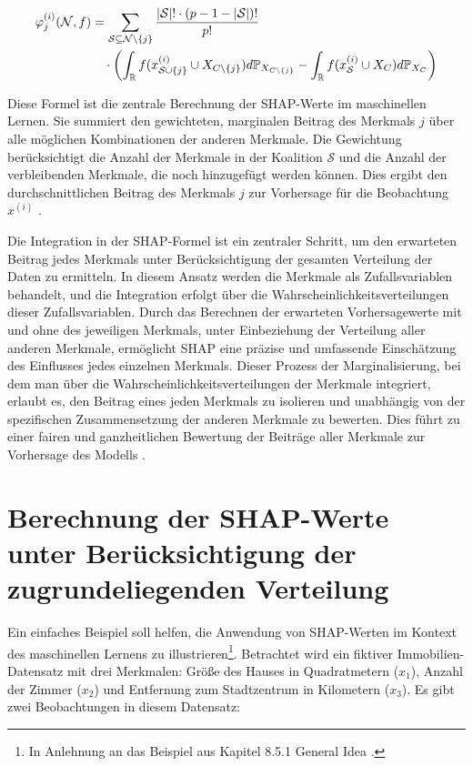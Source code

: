 \begin{align}
    \label{eq:shap-eq}
    \varphi^{(i)}_{j} (\mathcal{N}, f) &= \sum_{\mathcal{S} \subseteq \mathcal{N} \setminus \{j\}} \frac{|\mathcal{S}|! \cdot (p - 1 - |\mathcal{S}|)!}{p!} \\ \notag
    &\quad \cdot \left( \int_{\mathbb{R}} f(x^{(i)}_{\mathcal{S} \cup \{j\}} \cup X_{C \setminus \{j\}}) d\mathbb{P}_{X_{C \setminus \{j\}}} -
    \int_{\mathbb{R}} f(x^{(i)}_{\mathcal{S}} \cup X_{C}) d\mathbb{P}_{X_{C}} \right) 
\end{align}

Diese Formel ist die zentrale Berechnung der SHAP-Werte im maschinellen Lernen. 
Sie summiert den gewichteten, marginalen Beitrag des Merkmals $j$ über alle möglichen Kombinationen der anderen Merkmale. 
Die Gewichtung berücksichtigt die Anzahl der Merkmale in der Koalition $\mathcal{S}$ und die Anzahl der verbleibenden Merkmale, 
die noch hinzugefügt werden können. Dies ergibt den durchschnittlichen Beitrag des Merkmals $j$ zur Vorhersage für die 
Beobachtung $x^{(i)}$ \cite[S. 29, 30]{Molnar_2023}.

Die Integration in der SHAP-Formel ist ein zentraler Schritt, um den erwarteten Beitrag jedes Merkmals unter 
Berücksichtigung der gesamten Verteilung der Daten zu ermitteln. 
In diesem Ansatz werden die Merkmale als Zufallsvariablen behandelt, und die Integration erfolgt über 
die Wahrscheinlichkeitsverteilungen dieser Zufallsvariablen. Durch das Berechnen der erwarteten Vorhersagewerte mit 
und ohne des jeweiligen Merkmals, unter Einbeziehung der Verteilung aller anderen Merkmale, 
ermöglicht SHAP eine präzise und umfassende Einschätzung des Einflusses jedes einzelnen Merkmals. 
Dieser Prozess der Marginalisierung, bei dem man über die Wahrscheinlichkeitsverteilungen der Merkmale integriert, 
erlaubt es, den Beitrag eines jeden Merkmals zu isolieren und unabhängig von der spezifischen Zusammensetzung 
der anderen Merkmale zu bewerten. Dies führt zu einer fairen und ganzheitlichen Bewertung der Beiträge aller Merkmale 
zur Vorhersage des Modells \cite[S. 28]{Molnar_2023}.

\section{Berechnung der SHAP-Werte unter Berücksichtigung der zugrundeliegenden Verteilung}
\label{sec:example}

Ein einfaches Beispiel soll helfen, die Anwendung von SHAP-Werten im 
Kontext des maschinellen Lernens zu illustrieren\footnote{In Anlehnung an das Beispiel aus Kapitel 8.5.1 \glqq{}General Idea\grqq{} \cite[S.215f]{Molnar_2022}.}. Betrachtet wird ein fiktiver 
Immobilien-Datensatz mit drei Merkmalen: Größe des Hauses in Quadratmetern ($x_1$), Anzahl der Zimmer ($x_2$) 
und Entfernung zum Stadtzentrum in Kilometern ($x_3$). Es gibt zwei Beobachtungen in diesem Datensatz:

